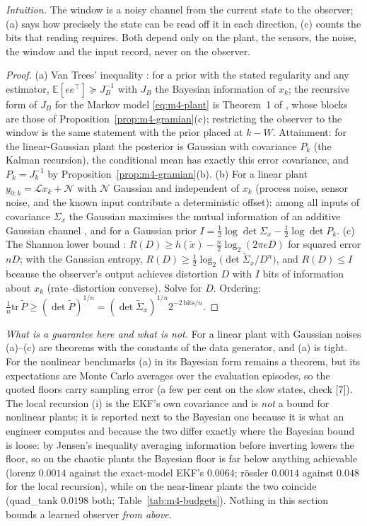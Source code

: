 \emph{Intuition.} The window is a noisy channel from the current state to the observer; (a) says how precisely
the state can be read off it in each direction, (c) counts the bits that reading requires. Both depend only on
the plant, the sensors, the noise, the window and the input record, never on the observer.
\begin{proof}
(a) Van Trees' inequality \citep[Ch.~2.4]{vantrees1968detection}: for a prior with the stated regularity and any
estimator, $\mathbb E[ee^\top]\succeq J_B^{-1}$ with $J_B$ the Bayesian information of $x_k$; the recursive form of
$J_B$ for the Markov model \eqref{eq:m4-plant} is Theorem~1 of \citet{tichavsky1998posterior}, whose blocks are
those of Proposition~\ref{prop:m4-gramian}(c); restricting the observer to the window is the same statement with
the prior placed at $k-W$. Attainment: for the linear-Gaussian plant the posterior is Gaussian with covariance
$P_k$ (the Kalman recursion), the conditional mean has exactly this error covariance, and $P_k=J_k^{-1}$ by
Proposition~\ref{prop:m4-gramian}(b). (b) For a linear plant $y_{0:k}=\mathcal L x_k+\mathcal N$ with $\mathcal N$
Gaussian and independent of $x_k$ (process noise, sensor noise, and the known input contribute a deterministic
offset): among all inputs of covariance $\Sigma_x$ the Gaussian maximises the mutual information of an additive
Gaussian channel \citep[Thm.~9.6.5]{cover2006elements}, and for a Gaussian prior
$I=\tfrac12\log\det\Sigma_x-\tfrac12\log\det P_k$. (c) The Shannon lower bound \citep[Thm.~10.4.1 and
eq.~(10.74)]{cover2006elements}: $R(D)\ge h(\tilde x)-\tfrac n2\log_2(2\pi eD)$ for squared error $nD$; with the
Gaussian entropy, $R(D)\ge\tfrac12\log_2\big(\det\tilde\Sigma_x/D^n\big)$, and $R(D)\le I$ because the observer's
output achieves distortion $D$ with $I$ bits of information about $x_k$ (rate--distortion converse). Solve for
$D$. Ordering: $\tfrac1n\mathrm{tr}\,\tilde P\ge(\det\tilde P)^{1/n}=(\det\tilde\Sigma_x)^{1/n}2^{-2\,\mathrm{bits}/n}$.
\end{proof}
\noindent\emph{What is a guarantee here and what is not.} For a linear plant with Gaussian noises (a)--(c) are
theorems with the constants of the data generator, and (a) is tight. For the nonlinear benchmarks (a) in its
Bayesian form remains a theorem, but its expectations are Monte Carlo averages over the evaluation episodes, so
the quoted floors carry sampling error (a few per cent on the slow states, check [7]). The local recursion (i) is
the EKF's own covariance and is \emph{not} a bound for nonlinear plants; it is reported next to the Bayesian one
because it is what an engineer computes and because the two differ exactly where the Bayesian bound is loose: by
Jensen's inequality averaging information before inverting lowers the floor, so on the chaotic plants the Bayesian
floor is far below anything achievable (lorenz $0.0014$ against the exact-model EKF's $0.0064$; r\"ossler $0.0014$
against $0.048$ for the local recursion), while on the near-linear plants the two coincide (quad\_tank $0.0198$ both;
Table~\ref{tab:m4-budgets}). Nothing in this section bounds a learned observer \emph{from above}.

